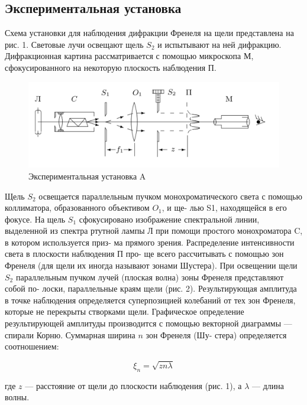 \documentclass[12pt]{kiarticle} %
\begin{document}
	\subsection{Экспериментальная установка}
	
	Схема установки для наблюдения дифракции Френеля на щели
представлена на рис. 1. Световые лучи освещают щель $ S_2 $ и испытывают на ней дифракцию. Дифракционная картина рассматривается с помощью микроскопа М, сфокусированного на некоторую плоскость наблюдения П.
	
	\begin{figure}[h!]
		\centering
		\includegraphics[width=0.8\linewidth]{a.png}
		\caption{Экспериментальная установка A}
		\label{labA}
	\end{figure}

Щель $ S_2 $ освещается параллельным пучком монохроматического
света с помощью коллиматора, образованного объективом $ O_1 $, и ще-
лью S1, находящейся в его фокусе. На щель $ S_1 $ сфокусировано изображение спектральной линии, выделенной из спектра ртутной лампы Л
при помощи простого монохроматора C, в котором используется приз-
ма прямого зрения.
Распределение интенсивности света в плоскости наблюдения П про-
ще всего рассчитывать с помощью зон Френеля (для щели их иногда
называют зонами Шустера). При освещении щели $ S_2 $ параллельным пучком лучей (плоская волна) зоны Френеля представляют собой по-
лоски, параллельные краям щели (рис. 2). Результирующая амплитуда
в точке наблюдения определяется суперпозицией колебаний от тех зон
Френеля, которые не перекрыты створками щели. Графическое определение результирующей амплитуды производится с помощью векторной
диаграммы --- спирали Корню. Суммарная ширина $ n $ зон Френеля (Шу-
стера) определяется соотношением:

\begin{equation}\label{xin}
\xi_n = \sqrt{zn\lambda}
\end{equation}

где $ z $ --- расстояние от щели до плоскости наблюдения (рис. 1), а $ \lambda $ --- длина волны.
\end{document}
